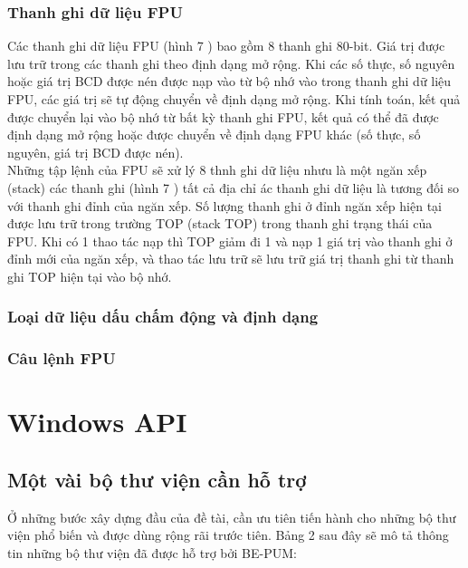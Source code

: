 		\subsubsection*{Thanh ghi dữ liệu FPU}
	Các thanh ghi dữ liệu FPU (hình 7 ) bao gồm 8 thanh ghi 80-bit. Giá trị được lưu trữ trong các thanh ghi theo định dạng mở rộng. Khi các số thực, số nguyên hoặc giá trị BCD được nén được nạp vào từ bộ nhớ vào trong thanh ghi dữ liệu FPU, các giá trị sẽ tự động chuyển về định dạng mở rộng. Khi tính toán, kết quả được chuyển lại vào bộ nhớ từ bất kỳ thanh ghi FPU, kết quả có thể đã được định dạng mở rộng hoặc được chuyển về định dạng FPU khác (số thực, số nguyên, giá trị BCD được nén).\\

	Những tập lệnh của FPU sẽ xử lý 8 thnh ghi dữ liệu nhưu là một ngăn xếp (stack) các thanh ghi (hình 7 ) tất cả địa chỉ ác thanh ghi dữ liệu là tương đối so với thanh ghi đỉnh của ngăn xếp. Số lượng thanh ghi ở đỉnh ngăn xếp hiện tại được lưu trữ trong trường TOP (stack TOP) trong thanh ghi trạng thái của FPU. Khi có 1 thao tác nạp thì TOP giảm đi 1 và nạp 1 giá trị vào thanh ghi ở đỉnh mới của ngăn xếp, và thao tác lưu trữ sẽ lưu trữ giá trị thanh ghi từ thanh ghi TOP hiện tại vào bộ nhớ.

		\subsubsection{Loại dữ liệu dấu chấm động và định dạng}
		\subsubsection{Câu lệnh FPU}	

\section{Windows API}

	\subsection{Một vài bộ thư viện cần hỗ trợ}

Ở những bước xây dựng đầu của đề tài, cần ưu tiên tiến hành cho những bộ thư viện phổ biến và được dùng rộng rãi trước tiên. Bảng 2 sau đây sẽ mô tả thông tin những bộ thư viện đã được hỗ trợ bởi BE-PUM:


